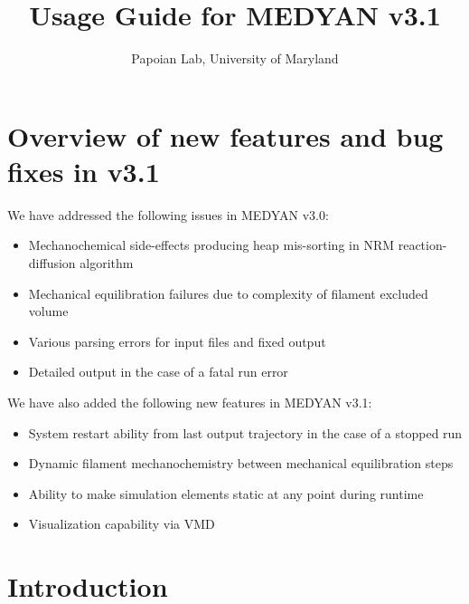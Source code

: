 \documentclass[11pt, oneside]{article}   	%
\title{Usage Guide for MEDYAN \textbf{v3.1}}
\author{Papoian Lab, University of Maryland}
\date{}							%
\begin{document}
\maketitle



\tableofcontents

\newpage	

\section {Overview of new features and bug fixes in v3.1}

We have addressed the following issues in MEDYAN v3.0:

\begin{itemize}

\item Mechanochemical side-effects producing heap mis-sorting in NRM reaction-diffusion algorithm
\item Mechanical equilibration failures due to complexity of filament excluded volume
\item Various parsing errors for input files and fixed output
\item Detailed output in the case of a fatal run error

\end{itemize} 

\noindent We have also added the following new features in MEDYAN v3.1:

\begin{itemize}

\item System restart ability from last output trajectory in the case of a stopped run
\item Dynamic filament mechanochemistry between mechanical equilibration steps 
\item Ability to make simulation elements static at any point during runtime
\item Visualization capability via VMD

\end{itemize}

\section {Introduction}
\end{document}
